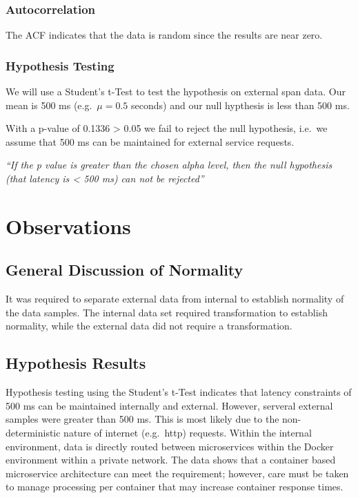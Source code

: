 \documentclass[
  letterpaper,
  DIV=11,
  numbers=noendperiod]{scrartcl}
\begin{document}
\hypertarget{autocorrelation-2}{%
\subsubsection{Autocorrelation}\label{autocorrelation-2}}

The ACF indicates that the data is random since the results are near
zero.

\hypertarget{hypothesis-testing-1}{%
\subsubsection{Hypothesis Testing}\label{hypothesis-testing-1}}

We will use a Student's t-Test to test the hypothesis on external span
data. Our mean is 500 ms (e.g.~\(\mu = 0.5\) seconds) and our null
hypthesis is less than 500 ms.

With a p-value of 0.1336 \textgreater{} 0.05 we fail to reject the null
hypothesis, i.e.~we assume that 500 ms can be maintained for external
service requests.

\emph{``If the p value is greater than the chosen alpha level, then the
null hypothesis (that latency is \textless{} 500 ms) can not be
rejected''}

\hypertarget{observations}{%
\section{Observations}\label{observations}}

\hypertarget{general-discussion-of-normality}{%
\subsection{General Discussion of
Normality}\label{general-discussion-of-normality}}

It was required to separate external data from internal to establish
normality of the data samples. The internal data set required
transformation to establish normality, while the external data did not
require a transformation.

\hypertarget{hypothesis-results}{%
\subsection{Hypothesis Results}\label{hypothesis-results}}

Hypothesis testing using the Student's t-Test indicates that latency
constraints of 500 ms can be maintained internally and external.
However, serveral external samples were greater than 500 ms. This is
most likely due to the non-deterministic nature of internet (e.g.~http)
requests. Within the internal environment, data is directly routed
between microservices within the Docker environment within a private
network. The data shows that a container based microservice architecture
can meet the requirement; however, care must be taken to manage
processing per container that may increase container response times.
\end{document}
